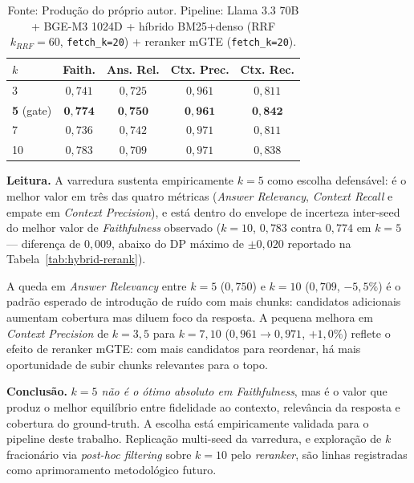 \documentclass[
  12pt,
  oneside,
  a4paper,
  english,
  brazil
]{abntex2}
\begin{document}
\begin{apendicesenv}
\begin{table}[ht]
  \caption{Varredura de \texttt{top\_k} sobre o gate final (corrida única
           por valor; 38 questões; juiz \texttt{gpt-4o-mini})}
  \label{tab:topk-sweep}
  \begin{tabularx}{\textwidth}{@{}Xcccc@{}}
  \toprule
  $k$ & \textbf{Faith.} & \textbf{Ans. Rel.} & \textbf{Ctx. Prec.} & \textbf{Ctx. Rec.} \\
  \midrule
  3                & $0{,}741$ & $0{,}725$ & $0{,}961$ & $0{,}811$ \\
  \textbf{5} (gate) & $\mathbf{0{,}774}$ & $\mathbf{0{,}750}$ & $\mathbf{0{,}961}$ & $\mathbf{0{,}842}$ \\
  7                & $0{,}736$ & $0{,}742$ & $0{,}971$ & $0{,}811$ \\
  10               & $0{,}783$ & $0{,}709$ & $0{,}971$ & $0{,}838$ \\
  \bottomrule
  \end{tabularx}
  \caption*{Fonte: Produção do próprio autor. Pipeline: Llama 3.3 70B +
            BGE-M3 1024D + híbrido BM25+denso (RRF $k_{RRF}=60$,
            \texttt{fetch\_k=20}) + reranker mGTE (\texttt{fetch\_k=20}).}
\end{table}

\textbf{Leitura.} A varredura sustenta empiricamente $k=5$ como escolha
defensável: é o melhor valor em três das quatro métricas
(\textit{Answer Relevancy}, \textit{Context Recall} e empate em
\textit{Context Precision}), e está dentro do envelope de incerteza
inter-seed do melhor valor de \textit{Faithfulness} observado ($k=10$,
$0{,}783$ contra $0{,}774$ em $k=5$ --- diferença de $0{,}009$, abaixo
do DP máximo de $\pm 0{,}020$ reportado na Tabela~\ref{tab:hybrid-rerank}).

A queda em \textit{Answer Relevancy} entre $k=5$ ($0{,}750$) e $k=10$
($0{,}709$, $-5{,}5\%$) é o padrão esperado de introdução de ruído com
mais chunks: candidatos adicionais aumentam cobertura mas diluem foco
da resposta. A pequena melhora em \textit{Context Precision} de $k=3,5$
para $k=7,10$ ($0{,}961 \to 0{,}971$, $+1{,}0\%$) reflete o efeito de
reranker mGTE: com mais candidatos para reordenar, há mais oportunidade
de subir chunks relevantes para o topo.

\textbf{Conclusão.} \emph{$k=5$ não é o ótimo absoluto em
\textit{Faithfulness}}, mas é o valor que produz o melhor equilíbrio
entre fidelidade ao contexto, relevância da resposta e cobertura do
ground-truth. A escolha está empiricamente validada para o pipeline
deste trabalho. Replicação multi-seed da varredura, e exploração de
$k$ fracionário via \textit{post-hoc filtering} sobre $k=10$ pelo
\textit{reranker}, são linhas registradas como aprimoramento
metodológico futuro.

\end{apendicesenv}
\end{document}
